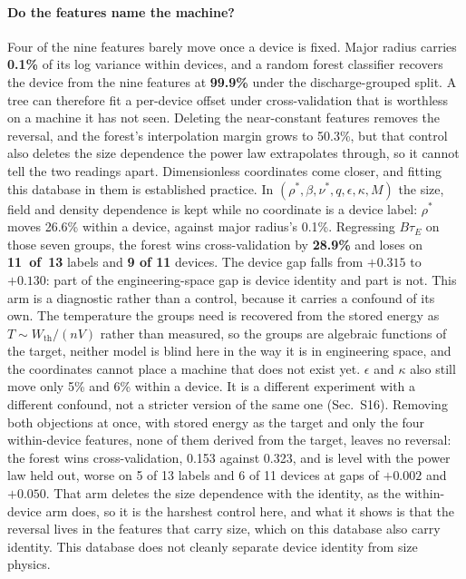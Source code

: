 \documentclass[aip,pop,preprint,amsmath,amssymb]{revtex4-2}
\begin{document}
\paragraph{Do the features name the machine?} Four of the nine features barely
move once a device is fixed. Major radius carries \textbf{0.1\%} of its log
variance within devices, and a random forest classifier recovers the device
from the nine features at \textbf{99.9\%} under the discharge-grouped split. A
tree can therefore fit a per-device offset under cross-validation that is
worthless on a machine it has not seen. Deleting the near-constant features
removes the reversal, and the forest's interpolation margin grows to 50.3\%,
but that control also deletes the size dependence the power law extrapolates
through, so it cannot tell the two readings apart. Dimensionless coordinates
come closer, and fitting this database in them is established
practice\cite{cordey,hdb5}. In $(\rho^{*},\beta,\nu^{*},q,\epsilon,\kappa,M)$
the size, field and density dependence is kept while no coordinate is a device
label: $\rho^{*}$ moves 26.6\% within a device, against major radius's 0.1\%.
Regressing $B\tau_{E}$ on those seven groups, the forest wins cross-validation
by \textbf{28.9\%} and loses on \textbf{11~of~13} labels and \textbf{9 of 11}
devices. The device gap falls from $+0.315$ to $+0.130$: part of the
engineering-space gap is device identity and part is not. This arm is a
diagnostic rather than a control, because it carries a confound of its own. The temperature the groups need is recovered from the
stored energy as $T\sim W_{\mathrm{th}}/(nV)$ rather than measured, so the
groups are algebraic functions of the target, neither model is blind here in
the way it is in engineering space, and the coordinates cannot place a machine
that does not exist yet. $\epsilon$ and $\kappa$ also still move only 5\% and
6\% within a device. It is a different experiment with a different confound,
not a stricter version of the same one (Sec.~S16). Removing both objections
at once, with stored energy as the target and only the four within-device
features, none of them derived from the target, leaves no reversal: the forest
wins cross-validation, 0.153 against 0.323, and is level with the power law
held out, worse on 5 of 13 labels and 6 of 11 devices at gaps of $+0.002$ and
$+0.050$. That arm deletes the size dependence with the identity, as the
within-device arm does, so it is the harshest control here, and what it shows
is that the reversal lives in the features that carry size, which on this
database also carry identity. This database does not cleanly separate device
identity from size physics.
\end{document}
